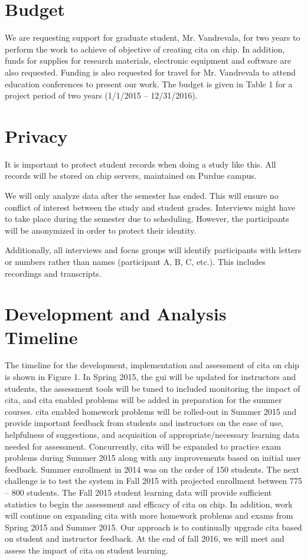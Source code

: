 \section{Budget}

We are requesting support for graduate student, Mr. Vandrevala, for two years to perform the work to achieve of objective of creating \gls{cita} on \gls{chip}. In addition, funds for supplies for research materials, electronic equipment and software are also requested. Funding is also requested for travel for Mr. Vandrevala to attend education conferences to present our work. The budget is given in Table 1 for a project period of two years (1/1/2015 – 12/31/2016).

\section{Privacy}

It is important to protect student records when doing a study like this. All records will be stored on \gls{chip} servers, maintained on Purdue campus.

We will only analyze data after the semester has ended. This will ensure no conflict of interest between the study and student grades. Interviews might have to take place during the semester due to scheduling. However, the participants will be anonymized in order to protect their identity.

Additionally, all interviews and focus groups will identify participants with letters or numbers rather than names (participant A, B, C, etc.). This includes recordings and transcripts.

\section{Development and Analysis Timeline}

The timeline for the development, implementation and assessment of \gls{cita} on \gls{chip} is shown in Figure 1. In Spring 2015, the \gls{gui} will be updated for instructors and students, the assessment tools will be tuned to included monitoring the impact of \gls{cita}, and \gls{cita} enabled problems will be added in preparation for the summer courses. \gls{cita} enabled homework problems will be rolled-out in Summer 2015 and provide important feedback from students and instructors on the ease of use, helpfulness of suggestions, and acquisition of appropriate/necessary learning data needed for assessment. Concurrently, \gls{cita} will be expanded to practice exam problems during Summer 2015 along with any improvements based on initial user feedback. Summer enrollment in 2014 was on the order of 150 students. The next challenge is to test the system in Fall 2015 with projected enrollment between 775 – 800 students. The Fall 2015 student learning data will provide sufficient statistics to begin the assessment and efficacy of \gls{cita} on \gls{chip}. In addition, work will continue on expanding \gls{cita} with more homework problems and exams from Spring 2015 and Summer 2015. Our approach is to continually upgrade \gls{cita} based on student and instructor feedback. At the end of fall 2016, we will meet and assess the impact of \gls{cita} on student learning.

